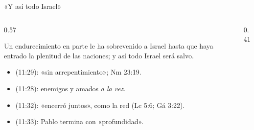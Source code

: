\begin{frame}{«Y así todo Israel»}
\begin{columns}[c,onlytextwidth]
\begin{column}{0.57\textwidth}
\begin{cita}Un endurecimiento en parte le ha sobrevenido a Israel hasta que haya entrado la plenitud de las naciones; y así todo Israel será salvo.\end{cita}
\scriptsize
\begin{itemize}
\item {} (11:29): «sin arrepentimiento»; Nm 23:19.
\item {} (11:28): enemigos y amados \emph{a la vez}.
\item {} (11:32): «encerró juntos», como la red (Lc 5:6; Gá 3:22).
\item {} (11:33): Pablo termina con «profundidad».
\end{itemize}
\end{column}
\begin{column}{0.41\textwidth}\end{column}
\end{columns}
\end{frame}

